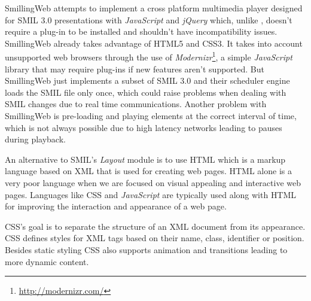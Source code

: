   SmillingWeb \cite{smillingweb} attempts to implement a cross platform multimedia player designed for \ac{SMIL} 3.0 presentations with \emph{JavaScript} and \emph{jQuery} which, unlike \cite{ambulant}, doesn't require a plug-in to be installed and shouldn't have incompatibility issues. 
  SmillingWeb already takes advantage of \ac{HTML}5 and \ac{CSS}3.
  It takes into account unsupported web browsers through the use of \emph{Modernizr}\footnote{\url{http://modernizr.com/}}, a simple \emph{JavaScript} library that may require plug-ins if new features aren't supported.  
  But SmillingWeb just implements a subset of \ac{SMIL} 3.0 and their scheduler engine loads the \ac{SMIL} file only once, which could raise problems when dealing with \ac{SMIL} changes due to real time communications.
  Another problem with SmillingWeb is pre-loading and playing elements at the correct interval of time, which is not always possible due to high latency networks leading to  pauses during playback.



  An alternative to \ac{SMIL}'s \emph{Layout} module is to use \ac{HTML} which is a markup language based on \ac{XML} that is used for creating web pages. \ac{HTML} alone is a very poor language when we are focused on visual appealing and interactive web pages. Languages like \ac{CSS} and \emph{JavaScript} are typically used along with \ac{HTML} for improving the interaction and appearance of a web page. 


  
  \ac{CSS}'s goal is to separate the structure of an \ac{XML} document from its appearance. \ac{CSS} defines styles for \ac{XML} tags based on their name, class, identifier or position.
  Besides static styling \ac{CSS} also supports animation and transitions leading to more dynamic content.

